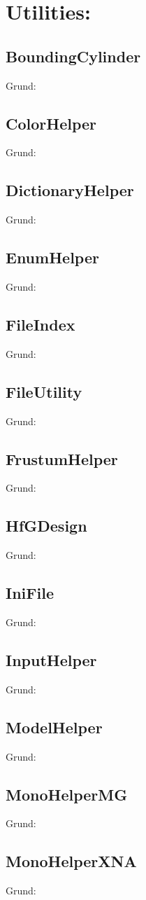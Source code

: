 \section{Utilities:}
\subsection{BoundingCylinder}
Grund:
\subsection{ColorHelper}
Grund:
\subsection{DictionaryHelper}
Grund:
\subsection{EnumHelper}
Grund:
\subsection{FileIndex}
Grund:
\subsection{FileUtility}
Grund:
\subsection{FrustumHelper}
Grund:
\subsection{HfGDesign}
Grund:
\subsection{IniFile}
Grund:
\subsection{InputHelper}
Grund:
\subsection{ModelHelper}
Grund:
\subsection{MonoHelperMG}
Grund:
\subsection{MonoHelperXNA}
Grund:
